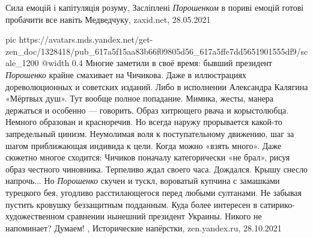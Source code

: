  
 
 
 
 
Сила емоцій і капітуляція розуму, Засліплені \emph{Порошенком} в пориві емоцій готові
пробачити все навіть Медведчуку, zaxid.net, 28.05.2021

\ifcmt
  pic https://avatars.mds.yandex.net/get-zen_doc/1328418/pub_617a5f15aa83b66f09805d56_617a5ffe7dd5651901555df9/scale_1200
  @width 0.4
\fi
Многие заметили в своё время: бывший президент \emph{Порошенко} крайне
смахивает на Чичикова. Даже в иллюстрациях дореволюционных и советских изданий.
Либо в исполнении Александра Калягина «Мёртвых душ». Тут вообще полное
попадание.  Мимика, жесты, манера держаться и особенно — говорить.  Образ
хитрющего рвача и корыстолюбца. Немного образован и красноречив. Но всегда
наружу прорывается какой-то запредельный цинизм. Неумолимая воля к
поступательному движению, шаг за шагом приближающая индивида к цели. Когда
можно «взять много». Даже сюжетно многое сходится: Чичиков поначалу
категорически «не брал», рисуя образ честного чиновника. Терпеливо ждал своего
часа. Дождался. Крышу снесло напрочь...  Но \emph{Порошенко} скучен и тускл,
вороватый купчина с замашками турецкого бея, угодливо расстилающегося перед
любыми султанами. Не забывая пустить кровушку беззащитным подданным. Куда более
интересен в сатирико-художественном сравнении нынешний президент Украины.
Никого не напоминает? Думаем!
, 
Исторические напёрстки, zen.yandex.ru, 28.10.2021

